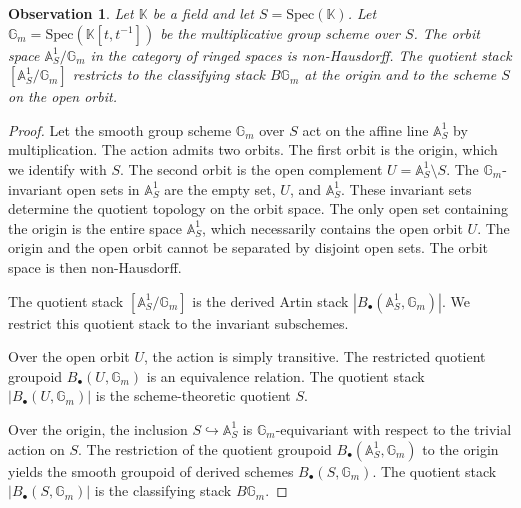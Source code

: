 \documentclass[reqno]{amsart}
\newtheorem{observation}[theorem]{Observation}
\theoremstyle{definition}
\theoremstyle{remark}
\begin{document}
\begin{observation}
  \label{prop:stack_necessity}
  Let $\mathbb{K}$ be a field and let $S = \mathrm{Spec}(\mathbb{K})$. Let $\mathbb{G}_m = \mathrm{Spec}(\mathbb{K}[t, t^{-1}])$ be the multiplicative group scheme over $S$. The orbit space $\mathbb{A}^1_S / \mathbb{G}_m$ in the category of ringed spaces is non-Hausdorff. The quotient stack $[\mathbb{A}^1_S / \mathbb{G}_m]$ restricts to the classifying stack $B\mathbb{G}_m$ at the origin and to the scheme $S$ on the open orbit.
\end{observation}
\begin{proof}
  Let the smooth group scheme $\mathbb{G}_m$ over $S$ act on the affine line $\mathbb{A}^1_S$ by multiplication. The action admits two orbits. The first orbit is the origin, which we identify with $S$. The second orbit is the open complement $U = \mathbb{A}^1_S \setminus S$. The $\mathbb{G}_m$-invariant open sets in $\mathbb{A}^1_S$ are the empty set, $U$, and $\mathbb{A}^1_S$. These invariant sets determine the quotient topology on the orbit space. The only open set containing the origin is the entire space $\mathbb{A}^1_S$, which necessarily contains the open orbit $U$. The origin and the open orbit cannot be separated by disjoint open sets. The orbit space is then non-Hausdorff.

  The quotient stack $[\mathbb{A}^1_S / \mathbb{G}_m]$ is the derived Artin stack $|B_\bullet(\mathbb{A}^1_S, \mathbb{G}_m)|$. We restrict this quotient stack to the invariant subschemes.

  Over the open orbit $U$, the action is simply transitive. The restricted quotient groupoid $B_\bullet(U, \mathbb{G}_m)$ is an equivalence relation. The quotient stack $|B_\bullet(U, \mathbb{G}_m)|$ is the scheme-theoretic quotient $S$.

  Over the origin, the inclusion $S \hookrightarrow \mathbb{A}^1_S$ is $\mathbb{G}_m$-equivariant with respect to the trivial action on $S$. The restriction of the quotient groupoid $B_\bullet(\mathbb{A}^1_S, \mathbb{G}_m)$ to the origin yields the smooth groupoid of derived schemes $B_\bullet(S, \mathbb{G}_m)$. The quotient stack $|B_\bullet(S, \mathbb{G}_m)|$ is the classifying stack $B\mathbb{G}_m$.   
  
\end{proof}
\vspace{1in}
\end{document}
